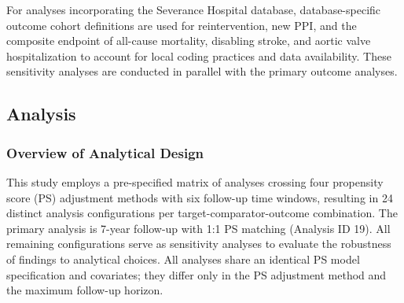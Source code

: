 \documentclass[
  12pt,
]{article}
\begin{document}
For analyses incorporating the Severance Hospital database,
database-specific outcome cohort definitions are used for
reintervention, new PPI, and the composite endpoint of all-cause
mortality, disabling stroke, and aortic valve hospitalization to account
for local coding practices and data availability. These sensitivity
analyses are conducted in parallel with the primary outcome analyses.

\subsection{Analysis}\label{analysis}

\subsubsection{Overview of Analytical
Design}\label{overview-of-analytical-design}

This study employs a pre-specified matrix of analyses crossing four
propensity score (PS) adjustment methods with six follow-up time
windows, resulting in 24 distinct analysis configurations per
target-comparator-outcome combination. The primary analysis is 7-year
follow-up with 1:1 PS matching (Analysis ID 19). All remaining
configurations serve as sensitivity analyses to evaluate the robustness
of findings to analytical choices. All analyses share an identical PS
model specification and covariates; they differ only in the PS
adjustment method and the maximum follow-up horizon.

\begingroup\fontsize{8}{10}\selectfont
\end{document}
